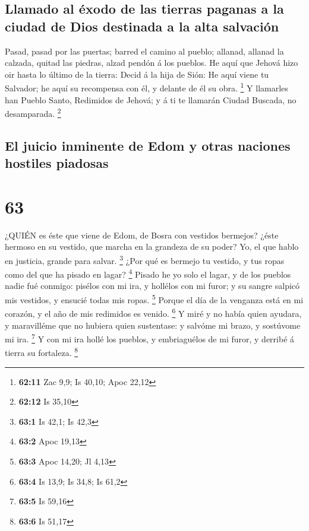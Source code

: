 \hypertarget{llamado-al-uxe9xodo-de-las-tierras-paganas-a-la-ciudad-de-dios-destinada-a-la-alta-salvaciuxf3n}{%
\subsection{Llamado al éxodo de las tierras paganas a la ciudad de Dios
destinada a la alta
salvación}\label{llamado-al-uxe9xodo-de-las-tierras-paganas-a-la-ciudad-de-dios-destinada-a-la-alta-salvaciuxf3n}}

 Pasad, pasad por las puertas; barred el camino al pueblo;
allanad, allanad la calzada, quitad las piedras, alzad pendón á los
pueblos.  He aquí que Jehová hizo oir hasta lo último de la
tierra: Decid á la hija de Sión: He aquí viene tu Salvador; he aquí su
recompensa con él, y delante de él su obra. \footnote{\textbf{62:11} Zac
  9,9; Is 40,10; Apoc 22,12}  Y llamarles han Pueblo Santo,
Redimidos de Jehová; y á ti te llamarán Ciudad Buscada, no desamparada.
\footnote{\textbf{62:12} Is 35,10}

\hypertarget{el-juicio-inminente-de-edom-y-otras-naciones-hostiles-piadosas}{%
\subsection{El juicio inminente de Edom y otras naciones hostiles
piadosas}\label{el-juicio-inminente-de-edom-y-otras-naciones-hostiles-piadosas}}

\hypertarget{section-62}{%
\section{63}\label{section-62}}

 ¿QUIÉN es éste que viene de Edom, de Bosra con vestidos
bermejos? ¿éste hermoso en su vestido, que marcha en la grandeza de su
poder? Yo, el que hablo en justicia, grande para salvar. \footnote{\textbf{63:1}
  Is 42,1; Is 42,3}  ¿Por qué es bermejo tu vestido, y tus
ropas como del que ha pisado en lagar? \footnote{\textbf{63:2} Apoc
  19,13}  Pisado he yo solo el lagar, y de los pueblos nadie
fué conmigo: pisélos con mi ira, y hollélos con mi furor; y su sangre
salpicó mis vestidos, y ensucié todas mis ropas. \footnote{\textbf{63:3}
  Apoc 14,20; Jl 4,13}  Porque el día de la venganza está en
mi corazón, y el año de mis redimidos es venido. \footnote{\textbf{63:4}
  Is 13,9; Is 34,8; Is 61,2}  Y miré y no había quien
ayudara, y maravilléme que no hubiera quien sustentase: y salvóme mi
brazo, y sostúvome mi ira. \footnote{\textbf{63:5} Is 59,16}
 Y con mi ira hollé los pueblos, y embriaguélos de mi furor,
y derribé á tierra su fortaleza. \footnote{\textbf{63:6} Is 51,17}

